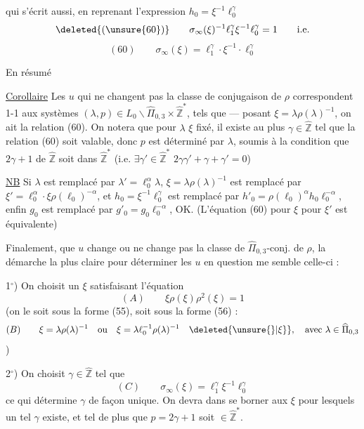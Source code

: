 qui s'écrit aussi, en reprenant l'expression $h_0=\xi^{-1}\ell_0^\gamma$
\[
\deleted{(\unsure{60})}\qquad
\sigma_\infty(\xi)^{-1}\ell_1^\gamma\xi^{-1}\ell_0^\gamma=1
\qquad\text{i.e.}
\]
\[
(60)\qquad \sigma_\infty(\xi)=\ell_1^\gamma\cdot\xi^{-1}\cdot\ell_0^\gamma
\]

En résumé

\uline{Corollaire} Les $u$ qui ne changent pas la classe de conjugaison de $\rho$  correspondent 1-1 aux systèmes $(\lambda,p)\in L_0\backslash\widehat{\Pi}_{0,3}\times\widehat{\mathbb Z}^{*}$, tels que --- posant $\xi=\lambda\rho(\lambda)^{-1}$,  on ait la relation (60).
On notera que pour $\lambda$  $\xi$ fixé, il existe au plus  $\gamma\in\widehat{\mathbb Z}$ tel que la relation (60) soit valable, donc $p$ est déterminé par $\lambda$, soumis à la condition  que  $2\gamma+1$ de $\widehat{\mathbb Z}$ soit dans $\widehat{\mathbb Z}^{*}$ (i.e. $\exists\gamma'\in\widehat{\mathbb Z}^{*}$  $2\gamma\gamma'+\gamma+\gamma'=0$)


\uline{NB} Si $\lambda$ est remplacé par $\lambda'=\ell_0^\alpha\lambda$, $\xi=\lambda\rho(\lambda)^{-1}$ est remplacé par $\xi'=\ell_0^\alpha\cdot\xi\rho(\ell_0)^{-\alpha}$, et $h_0=\xi^{-1}\ell_0^\gamma$ est remplacé par $h'_0=\rho(\ell_0)^\alpha h_0\ell_0^{-\alpha}$, enfin $g_0$ est remplacé par $g'_0=g_0\ell_0^{-\alpha}$, OK. \unsure{!} (L'équation (60) pour $\xi$  pour $\xi'$ est équivalente)

Finalement, que $u$ change ou ne change pas la classe de $\widehat{\Pi}_{0,3}$-conj. de $\rho$, la démarche la plus claire pour déterminer les $u$ en question me semble celle-ci :

1$^\circ$) On choisit un $\xi$  satisfaisant l'équation
\[
(A)\qquad \xi\rho(\xi)\rho^2(\xi)=1
\]
(on le  soit sous la forme (55), soit sous la forme (56)\deleted{\unsure{)}} :
\[
(B)\qquad
\xi=\lambda\rho(\lambda)^{-1}
\quad\text{ou}\quad
\xi=\lambda\ell_0^{-1}\rho(\lambda)^{-1}
\quad\deleted{\unsure{\rbrace|\xi}},\quad\text{avec }\lambda\in\widehat{\Pi}_{0,3}
\]
)

2$^\circ$) On choisit $\gamma\in\widehat{\mathbb Z}$ tel que
\[
(C)\qquad \sigma_\infty(\xi)=\ell_1^\gamma\xi^{-1}\ell_0^\gamma
\]
ce qui détermine $\gamma$ de façon unique. On devra dans  se borner aux $\xi$  pour lesquels un tel $\gamma$ existe, et tel de plus que $p=2\gamma+1$ soit $\in\widehat{\mathbb Z}^{*}$.
